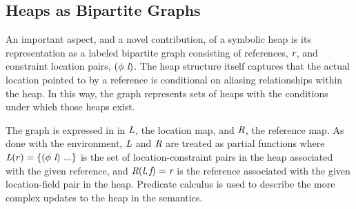 \subsection{Heaps as Bipartite Graphs}
An important aspect, and a novel contribution, of a symbolic heap is its
representation as a labeled bipartite graph consisting of
references, $\emph{r}$, and constraint location pairs,
$\lp\phi\ \cfgnt{l}\rp$. The heap structure itself captures that the actual
location pointed to by a reference is conditional on aliasing
relationships within the heap. In this way, the graph represents sets
of heaps with the conditions under which those heaps exist.

The graph is expressed in in $\emph{L}$, the location map, and
$\emph{R}$, the reference map. As done with the environment,
$\emph{L}$ and $\emph{R}$ are treated as partial functions where
$\cfgnt{L}(r) = \{(\phi\ \cfgnt{l})\ ...\}$ is the set of
location-constraint pairs in the heap associated with the given
reference, and $\emph{R}(\emph{l},\emph{f}) = \emph{r}$ is the
reference associated with the given location-field pair in the
heap. Predicate calculus is used to describe the more complex updates
to the heap in the semantics.

